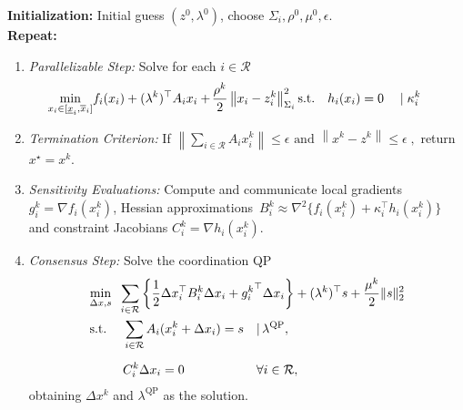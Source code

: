 \documentclass[]{scrartcl}
\begin{document}
\begin{algorithm}
	
	\caption{Augmented Lagrangian Alternating Direction Inexact Newto{}n (ALADIN)}
	\textbf{Initialization:} Initial guess $(z^0,\lambda^0)$, choose $\Sigma_i,\rho^0,\mu^0,\epsilon$. \\
	\textbf{Repeat:}
	\begin{enumerate}
		\item \textit{Parallelizable Step:} \label{step:parStep}
		Solve for each $i \in \mathcal{R}$
		\begin{align}
		\begin{split}
		\label{eq::denlp}
		\underset{x_i\in[\underline x_i, \overline x_i]}{\min}& f_i(x_i) + (\lambda^k)^\top A_i x_i + \hspace{-0.1em} \frac{\rho^k}{2}\left\|x_i-z_i^k\right\|_{\Sigma_i}^2
		\text{s.t.}\quad h_i(x_i) = 0 \quad \mid \kappa_i^k \quad 
		\end{split}	
		\end{align}
		\item \textit{Termination Criterion:} If 
		$
		\label{eq::stop}
		\left\|\sum_{i\in \mathcal{R}}A_ix^k_i\right\|\leq \epsilon \text{ and } \left\| x^k - z^k \right \|\leq \epsilon\;,
		$
		return $x^\star = x^k$.
		
		\item \textit{Sensitivity Evaluations:} Compute and communicate local gradients~$g_i^k=\nabla f_i(x_i^k)$,
		Hessian approximations~{$B_i^k \approx \nabla^2\{f_i(x_i^k)+\kappa_i^\top h_i(x_i^k)\}$} and constraint Jacobians $C^k_i = \nabla h_i(x^k_i)$. 
		
		\item \textit{Consensus Step:} Solve the coordination QP 
		\begin{align} 
		\notag
		&\underset{\Delta x,s}{\min}\;\;\sum_{i\in \mathcal{R}}\left\{\frac{1}{2}\Delta x_i^\top B^k_i\Delta x_i + {g_i^k}^\top \Delta x_i\right\}     + (\lambda^k)^\top s + \frac{\mu^k}{2}\|s\|^2_2  \\ 
		&\begin{aligned}\label{eq:coordQP}
		\text{s.t.}\;                                  &\quad \sum_{i\in \mathcal{R}}A_i(x^k_i+\Delta x_i) =  s     &&|\, \lambda^\mathrm{QP},\\[0.2cm]
		&\quad C^k_i \Delta x_i = 0                                    &&\forall i\in \mathcal{R},
		\end{aligned}
		\end{align}
		obtaining $\Delta x^k$ and $\lambda^{\text{QP}}$ as the solution.
		

\end{enumerate}
\end{algorithm}
\end{document}
